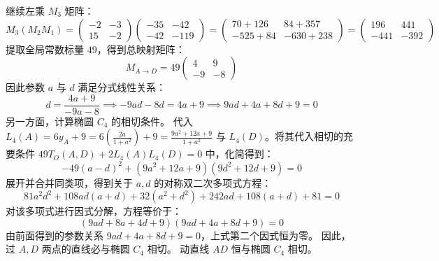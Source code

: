 \begin{solution}
继续左乘 $M_3$ 矩阵：
$$ M_3 (M_2 M_1) = \begin{pmatrix} -2 & -3 \\ 15 & -2 \end{pmatrix} \begin{pmatrix} -35 & -42 \\ -42 & -119 \end{pmatrix} = \begin{pmatrix} 70 + 126 & 84 + 357 \\ -525 + 84 & -630 + 238 \end{pmatrix} = \begin{pmatrix} 196 & 441 \\ -441 & -392 \end{pmatrix} $$
提取全局常数标量 $49$，得到总映射矩阵：
$$ M_{A \to D} = 49 \begin{pmatrix} 4 & 9 \\ -9 & -8 \end{pmatrix} $$
因此参数 $a$ 与 $d$ 满足分式线性关系：
$$ d = \frac{4a + 9}{-9a - 8} \implies -9ad - 8d = 4a + 9 \implies 9ad + 4a + 8d + 9 = 0 $$
另一方面，计算椭圆 $C_4$ 的相切条件。
代入 $L_4(A) = 6y_A + 9 = 6\left( \frac{2a}{1+a^2} \right) + 9 = \frac{9a^2+12a+9}{1+a^2}$ 与 $L_4(D)$。将其代入相切的充要条件 $49 T_O(A,D) + 2 L_4(A)L_4(D) = 0$ 中，化简得到：
$$ -49(a-d)^2 + (9a^2+12a+9)(9d^2+12d+9) = 0 $$
展开并合并同类项，得到关于 $a, d$ 的对称双二次多项式方程：
$$ 81a^2d^2 + 108ad(a+d) + 32(a^2+d^2) + 242ad + 108(a+d) + 81 = 0 $$
对该多项式进行因式分解，方程等价于：
$$ (9ad + 8a + 4d + 9)(9ad + 4a + 8d + 9) = 0 $$
由前面得到的参数关系 $9ad + 4a + 8d + 9 = 0$，上式第二个因式恒为零。
因此，过 $A, D$ 两点的直线必与椭圆 $C_4$ 相切。
动直线 $AD$ 恒与椭圆 $C_4$ 相切。
\end{solution}



